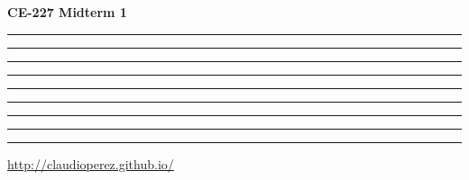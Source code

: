 \documentclass[9pt,landscape]{article}
\begin{document}
\raggedright
\footnotesize
\begin{multicols}{4}


\setlength{\premulticols}{1pt}
\setlength{\postmulticols}{1pt}
\setlength{\multicolsep}{1pt}
\setlength{\columnsep}{2pt}

\begin{center}
     \Large{\textbf{CE-227 Midterm 1}} \\
\end{center}

\vspace{2mm}


\hrule

\vspace{1.5mm}

\hrule
\vspace{1.5mm}



\vspace{1.5mm}

\hrule

\vspace{1.5mm}

\hrule
\vspace{1.5mm}


\vspace{1.5mm}

\hrule
\vspace{1.5mm}

\vspace{1.5mm}

\hrule


\vspace{1.5mm}

\hrule

\vspace{1.5mm}

\hrule

\rule{0.3\linewidth}{0.25pt}
\scriptsize


\href{http://claudioperez.github.io/}{http://claudioperez.github.io/}


\end{multicols}
\end{document}
